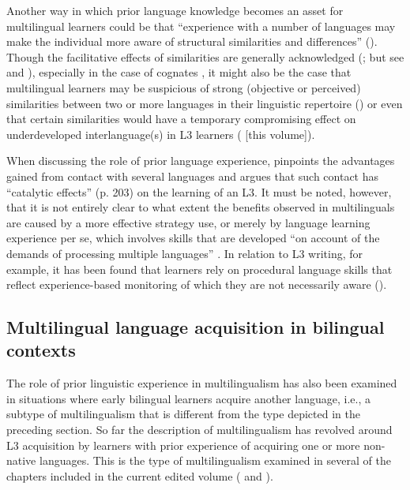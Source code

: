 \documentclass[output=paper]{../langscibook}
\begin{document}
Another way in which prior language knowledge becomes an asset for multilingual learners could be that “experience with a number of languages may make the individual more aware of structural similarities and differences” (\citealt[11]{McLaughlinNayak1989}). Though the facilitative effects of similarities are generally acknowledged (\citealt{Ringbom2007, RutgersEvans2017}; but see \citealt{SwainEtAl1990} and \citealt{GibsonEtAl2001}), especially in the case of cognates , it might also be the case that multilingual learners may be suspicious of strong (objective or perceived) similarities between two or more languages in their linguistic repertoire (\citealt{Fouser2001, OtwinowskaSzewczyk2017}) or even that certain similarities would have a temporary compromising effect on underdeveloped interlanguage(s) in L3 learners (\citealt{BardelFalk2007, Rast2010, Sánchez2012, chapters/sanchez7} [this volume]).

When discussing the role of prior language experience, \citet{Jessner1999} pinpoints the advantages gained from contact with several languages and argues that such contact has “catalytic effects” (p. 203) on the learning of an L3. It must be noted, however, that it is not entirely clear to what extent the benefits observed in multilinguals are caused by a more effective strategy use, or merely by language learning experience per se, which involves skills that are developed “on account of the demands of processing multiple languages” \citep[243]{Kemp2007}. In relation to L3 writing, for example, it has been found that learners rely on procedural language skills that reflect experience-based monitoring of which they are not necessarily aware (\citealt{RutgersEvans2017}).

\subsection{Multilingual language acquisition in bilingual contexts}\label{sec:sanchez1:1.2}

The role of prior linguistic experience in multilingualism has also been examined in situations where early bilingual learners acquire another language, i.e., a subtype of multilingualism that is different from the type depicted in the preceding section. So far the description of multilingualism has revolved around L3 acquisition by learners with prior experience of acquiring one or more non-native languages. This is the type of multilingualism examined in several of the chapters included in the current edited volume (\citeauthor{chapters/gudmundson, chapters/salaberry, chapters/sanchez7, chapters/sciutti} and \citeauthor{chapters/stadt}).
\end{document}
